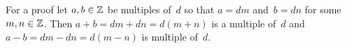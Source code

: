 \documentclass{test}  %
\begin{document}
\begin{problem}
\begin{exes}
\begin{answer}
  For a proof
  let $a,b\in\mathbb{Z}$ be multiples of~$d$ so that $a=dm$ and~$b=dn$ 
  for some $m,n\in\mathbb{Z}$.
  Then $a+b=dm+dn=d(m+n)$ is a multiple of~$d$
  and $a-b=dm-dn=d(m-n)$ is multiple of~$d$.    
\end{answer}

 
\end{exes}
\end{problem}
\end{document}
